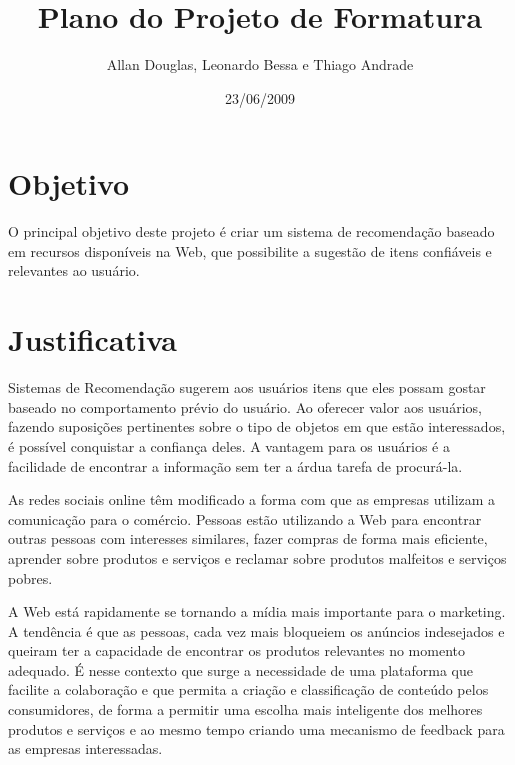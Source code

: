 \documentclass[]{article}
\title{Plano do Projeto de Formatura}
\author{Allan Douglas, Leonardo Bessa e Thiago Andrade  }
\date{23/06/2009}
\begin{document}
\ifpdf
{}
\else
{}
\fi

\maketitle


\section{Objetivo} %
\label{sec:objetivo}

 O principal objetivo deste projeto é criar um sistema de recomendação baseado em recursos disponíveis na Web, que possibilite a sugestão de itens confiáveis e relevantes ao usuário.


\section{Justificativa} %
\label{sec:objetivos_e_justificativas}

Sistemas de Recomendação sugerem aos usuários itens que eles possam gostar baseado no comportamento prévio do usuário. Ao oferecer valor aos usuários, fazendo suposições pertinentes sobre o tipo de objetos em que estão interessados, é possível conquistar a conﬁança deles. A vantagem para os usuários é a facilidade de encontrar a informação sem ter a árdua tarefa de procurá-la.

As redes sociais online têm modiﬁcado a forma com que as empresas utilizam a comunicação para o comércio. Pessoas estão utilizando a Web para encontrar outras pessoas com interesses similares, fazer compras de forma mais eﬁciente, aprender sobre produtos e serviços e reclamar sobre produtos malfeitos e serviços pobres.

A Web está rapidamente se tornando a mídia mais importante para o marketing. A tendência é que as pessoas, cada vez mais bloqueiem os anúncios indesejados e queiram ter a capacidade de encontrar os produtos relevantes no momento adequado. É nesse contexto que surge a necessidade de uma plataforma que facilite a colaboração e que permita a criação e classiﬁcação de conteúdo pelos consumidores, de forma a permitir uma escolha mais inteligente dos melhores produtos e serviços e ao mesmo tempo criando uma mecanismo de feedback para as empresas interessadas.
\end{document}
